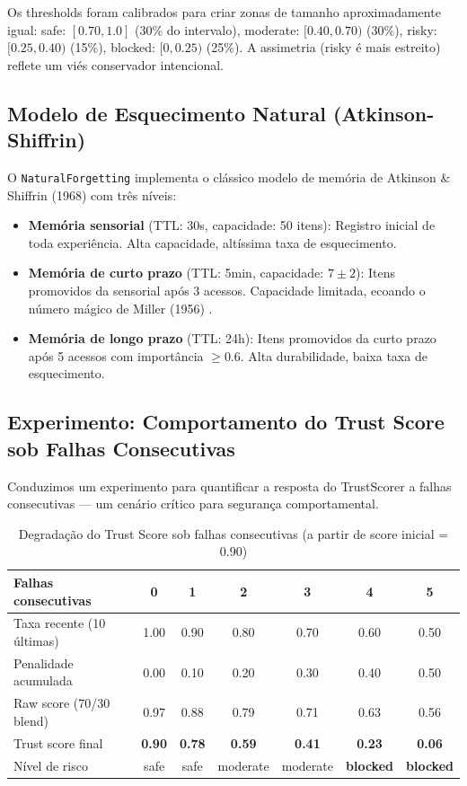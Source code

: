 Os thresholds foram calibrados para criar zonas de tamanho aproximadamente igual: safe: $[0.70, 1.0]$ (30\% do intervalo), moderate: $[0.40, 0.70)$ (30\%), risky: $[0.25, 0.40)$ (15\%), blocked: $[0, 0.25)$ (25\%). A assimetria (risky é mais estreito) reflete um viés conservador intencional.

\subsection{Modelo de Esquecimento Natural (Atkinson-Shiffrin)}

O \texttt{NaturalForgetting} implementa o clássico modelo de memória de Atkinson \& Shiffrin (1968) \cite{Atkinson1968_Memory} com três níveis:

\begin{itemize}
    \item \textbf{Memória sensorial} (TTL: 30s, capacidade: 50 itens): Registro inicial de toda experiência. Alta capacidade, altíssima taxa de esquecimento.
    \item \textbf{Memória de curto prazo} (TTL: 5min, capacidade: $7 \pm 2$): Itens promovidos da sensorial após 3 acessos. Capacidade limitada, ecoando o número mágico de Miller (1956) \cite{Miller1956_Magical7}.
    \item \textbf{Memória de longo prazo} (TTL: 24h): Itens promovidos da curto prazo após 5 acessos com importância $\geq 0.6$. Alta durabilidade, baixa taxa de esquecimento.
\end{itemize}

\subsection{Experimento: Comportamento do Trust Score sob Falhas Consecutivas}

Conduzimos um experimento para quantificar a resposta do TrustScorer a falhas consecutivas — um cenário crítico para segurança comportamental.

\begin{table}[htbp]
\centering
\caption{Degradação do Trust Score sob falhas consecutivas (a partir de score inicial = 0.90)}
\label{tab:trust-degradation}
\begin{tabular}{@{}p{3cm}cccccc@{}}
\toprule
\textbf{Falhas consecutivas} & \textbf{0} & \textbf{1} & \textbf{2} & \textbf{3} & \textbf{4} & \textbf{5} \\
\midrule
Taxa recente (10 últimas) & 1.00 & 0.90 & 0.80 & 0.70 & 0.60 & 0.50 \\
Penalidade acumulada & 0.00 & 0.10 & 0.20 & 0.30 & 0.40 & 0.50 \\
Raw score (70/30 blend) & 0.97 & 0.88 & 0.79 & 0.71 & 0.63 & 0.56 \\
Trust score final & \textbf{0.90} & \textbf{0.78} & \textbf{0.59} & \textbf{0.41} & \textbf{0.23} & \textbf{0.06} \\
Nível de risco & safe & safe & moderate & moderate & \textbf{blocked} & \textbf{blocked} \\
\bottomrule
\end{tabular}
\end{table}

